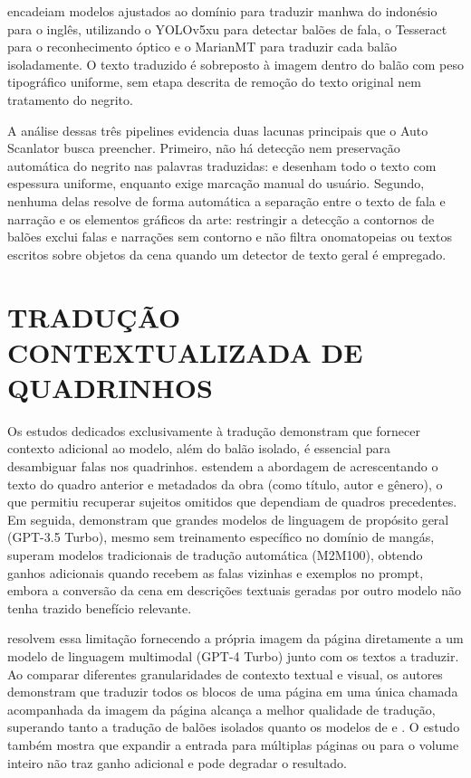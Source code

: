 \documentclass[
    12pt,
    openright,
    oneside,
    a4paper,
    chapter=TITLE,
    section=TITLE,
    english,
    brazilian,
    brazil
]{abntex2}
\begin{document}
 encadeiam modelos ajustados ao domínio para traduzir manhwa do indonésio para o inglês, utilizando o YOLOv5xu para detectar balões de fala, o Tesseract para o reconhecimento óptico e o MarianMT para traduzir cada balão isoladamente. O texto traduzido é sobreposto à imagem dentro do balão com peso tipográfico uniforme, sem etapa descrita de remoção do texto original nem tratamento do negrito.

A análise dessas três pipelines evidencia duas lacunas principais que o Auto Scanlator busca preencher. Primeiro, não há detecção nem preservação automática do negrito nas palavras traduzidas:  e  desenham todo o texto com espessura uniforme, enquanto  exige marcação manual do usuário. Segundo, nenhuma delas resolve de forma automática a separação entre o texto de fala e narração e os elementos gráficos da arte: restringir a detecção a contornos de balões exclui falas e narrações sem contorno e não filtra onomatopeias ou textos escritos sobre objetos da cena quando um detector de texto geral é empregado.

\section{TRADUÇÃO CONTEXTUALIZADA DE QUADRINHOS}
\label{sec:traducao-contextualizada}

Os estudos dedicados exclusivamente à tradução demonstram que fornecer contexto adicional ao modelo, além do balão isolado, é essencial para desambiguar falas nos quadrinhos.  estendem a abordagem de  acrescentando o texto do quadro anterior e metadados da obra (como título, autor e gênero), o que permitiu recuperar sujeitos omitidos que dependiam de quadros precedentes. Em seguida,  demonstram que grandes modelos de linguagem de propósito geral (GPT-3.5 Turbo), mesmo sem treinamento específico no domínio de mangás, superam modelos tradicionais de tradução automática (M2M100), obtendo ganhos adicionais quando recebem as falas vizinhas e exemplos no prompt, embora a conversão da cena em descrições textuais geradas por outro modelo não tenha trazido benefício relevante.

 resolvem essa limitação fornecendo a própria imagem da página diretamente a um modelo de linguagem multimodal (GPT-4 Turbo) junto com os textos a traduzir. Ao comparar diferentes granularidades de contexto textual e visual, os autores demonstram que traduzir todos os blocos de uma página em uma única chamada acompanhada da imagem da página alcança a melhor qualidade de tradução, superando tanto a tradução de balões isolados quanto os modelos de  e . O estudo também mostra que expandir a entrada para múltiplas páginas ou para o volume inteiro não traz ganho adicional e pode degradar o resultado.
\end{document}
